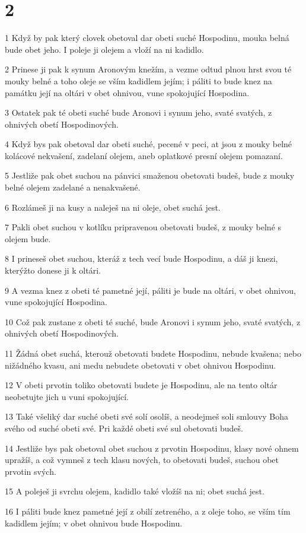 \chapter{2}

\par 1 Když by pak který clovek obetoval dar obeti suché Hospodinu, mouka belná bude obet jeho. I poleje ji olejem a vloží na ni kadidlo.
\par 2 Prinese ji pak k synum Aronovým knežím, a vezme odtud plnou hrst svou té mouky belné a toho oleje se vším kadidlem jejím; i páliti to bude knez na památku její na oltári v obet ohnivou, vune spokojující Hospodina.
\par 3 Ostatek pak té obeti suché bude Aronovi i synum jeho, svaté svatých, z ohnivých obetí Hospodinových.
\par 4 Když bys pak obetoval dar obeti suché, pecené v peci, at jsou z mouky belné kolácové nekvašení, zadelaní olejem, aneb oplatkové presní olejem pomazaní.
\par 5 Jestliže pak obet suchou na pánvici smaženou obetovati budeš, bude z mouky belné olejem zadelané a nenakvašené.
\par 6 Rozlámeš ji na kusy a naleješ na ni oleje, obet suchá jest.
\par 7 Pakli obet suchou v kotlíku pripravenou obetovati budeš, z mouky belné s olejem bude.
\par 8 I prineseš obet suchou, kteráž z tech vecí bude Hospodinu, a dáš ji knezi, kterýžto donese ji k oltári.
\par 9 A vezma knez z obeti té pametné její, páliti je bude na oltári, v obet ohnivou, vune spokojující Hospodina.
\par 10 Což pak zustane z obeti té suché, bude Aronovi i synum jeho, svaté svatých, z ohnivých obetí Hospodinových.
\par 11 Žádná obet suchá, kterouž obetovati budete Hospodinu, nebude kvašena; nebo nižádného kvasu, ani medu nebudete obetovati v obet ohnivou Hospodinu.
\par 12 V obeti prvotin toliko obetovati budete je Hospodinu, ale na tento oltár neobetujte jich u vuni spokojující.
\par 13 Také všeliký dar suché obeti své solí osolíš, a neodejmeš soli smlouvy Boha svého od suché obeti své. Pri každé obeti své sul obetovati budeš.
\par 14 Jestliže bys pak obetoval obet suchou z prvotin Hospodinu, klasy nové ohnem upražíš, a což vymneš z tech klasu nových, to obetovati budeš, suchou obet prvotin svých.
\par 15 A poleješ ji svrchu olejem, kadidlo také vložíš na ni; obet suchá jest.
\par 16 I páliti bude knez pametné její z obilí zetreného, a z oleje toho, se vším tím kadidlem jejím; v obet ohnivou bude Hospodinu.


